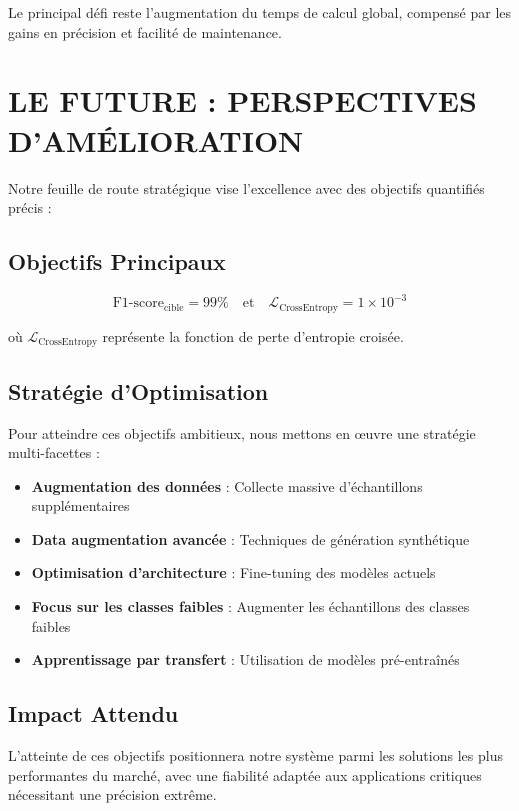 \documentclass[letterpaper, 10 pt, conference]{ieeeconf}  %
\begin{document}
Le principal défi reste l'augmentation du temps de calcul global, compensé par les gains en précision et facilité de maintenance.

\section{LE FUTURE : PERSPECTIVES D'AMÉLIORATION}

Notre feuille de route stratégique vise l'excellence avec des objectifs quantifiés précis :

\subsection{Objectifs Principaux}

\begin{equation}
\text{F1-score}_{\text{cible}} = 99\% \quad \text{et} \quad \mathcal{L}_{\text{CrossEntropy}} = 1 \times 10^{-3}
\end{equation}

où $\mathcal{L}_{\text{CrossEntropy}}$ représente la fonction de perte d'entropie croisée.

\subsection{Stratégie d'Optimisation}

Pour atteindre ces objectifs ambitieux, nous mettons en œuvre une stratégie multi-facettes :

\begin{itemize}
\item \textbf{Augmentation des données} : Collecte massive d'échantillons supplémentaires
\item \textbf{Data augmentation avancée} : Techniques de génération synthétique
\item \textbf{Optimisation d'architecture} : Fine-tuning des modèles actuels
\item \textbf{Focus sur les classes faibles} : Augmenter les échantillons des classes faibles
\item \textbf{Apprentissage par transfert} : Utilisation de modèles pré-entraînés
\end{itemize}

\subsection{Impact Attendu}

L'atteinte de ces objectifs positionnera notre système parmi les solutions les plus performantes du marché, avec une fiabilité adaptée aux applications critiques nécessitant une précision extrême.
\end{document}
